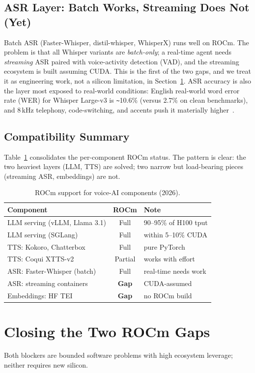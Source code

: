 \documentclass[blind]{gtac}
\begin{document}
\subsection{ASR Layer: Batch Works, Streaming Does Not (Yet)}
Batch ASR (Faster-Whisper, distil-whisper, WhisperX) runs well on ROCm. The problem is that all Whisper variants are \emph{batch-only}; a real-time agent needs \emph{streaming} ASR paired with voice-activity detection (VAD), and the streaming ecosystem is built assuming CUDA. This is the first of the two gaps, and we treat it as engineering work, not a silicon limitation, in Section~\ref{sec:gaps}. ASR accuracy is also the layer most exposed to real-world conditions: English real-world word error rate (WER) for Whisper Large-v3 is \texttt{\textasciitilde}10.6\% (versus 2.7\% on clean benchmarks), and 8\,kHz telephony, code-switching, and accents push it materially higher~\cite{whisper_wer,indic_asr}.

\subsection{Compatibility Summary}
Table~\ref{tab:compat} consolidates the per-component ROCm status. The pattern is clear: the two heaviest layers (LLM, TTS) are solved; two narrow but load-bearing pieces (streaming ASR, embeddings) are not.

\begin{table}[t]
\centering
\caption{ROCm support for voice-AI components (2026).}
\label{tab:compat}
\footnotesize
\begin{tabular}{@{}lcl@{}}
\toprule
Component & ROCm & Note \\
\midrule
LLM serving (vLLM, Llama 3.1) & Full & 90--95\% of H100 tput \\
LLM serving (SGLang) & Full & within 5--10\% CUDA \\
TTS: Kokoro, Chatterbox & Full & pure PyTorch \\
TTS: Coqui XTTS-v2 & Partial & works with effort \\
ASR: Faster-Whisper (batch) & Full & real-time needs work \\
ASR: streaming containers & \textbf{Gap} & CUDA-assumed \\
Embeddings: HF TEI & \textbf{Gap} & no ROCm build \\
\bottomrule
\end{tabular}
\end{table}

\section{Closing the Two ROCm Gaps}
\label{sec:gaps}
Both blockers are bounded software problems with high ecosystem leverage; neither requires new silicon.
\end{document}
